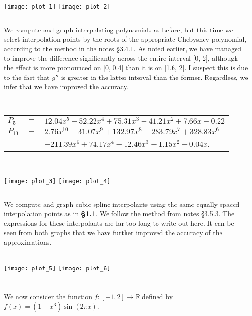 \documentclass[11pt, oneside]{article}
\begin{document}
~\\

\texttt{[image: plot\_1]}
\texttt{[image: plot\_2]}

\subsection{}

We compute and graph interpolating polynomials as before, but this time we select interpolation points by the roots of the appropriate Chebyshev polynomial, according to the method in the notes \S 3.4.1. As noted earlier, we have managed to improve the difference significantly across the entire interval [0, 2], although the effect is more pronounced on [0, 0.4] than it is on [1.6, 2]. I suspect this is due to the fact that $g''$ is greater in the latter interval than the former. Regardless, we infer that we have improved the accuracy. 

~\\


\begin{tabular}{l c l}
$P_5$ & $=$ & $12.04x^5 -52.22x^4 + 75.31x^3 -41.21x^2 + 7.66x -0.22$ \\
$P_{10}$ & $=$ &
$2.76x^{10} -31.07x^9 + 132.97x^8 -283.79x^7 + 328.83x^6 
$ \\
& & $-211.39x^5 + 74.17x^4 -12.46x^3 + 1.15x^2 -0.04x$.
\end{tabular}
\\
\flushleft

\texttt{[image: plot\_3]}
\texttt{[image: plot\_4]}

\subsection{}

We compute and graph cubic spline interpolants using the same equally spaced interpolation points as in  \textbf{\S1.1}. We follow the method from notes \S3.5.3. The expressions for these interpolants are far too long to write out here. It can be seen from both graphs that we have further improved the accuracy of the approximations. 
 
 ~\\

\texttt{[image: plot\_5]}
\texttt{[image: plot\_6]}


\section{}

We now consider the function $f: [-1, 2] \rightarrow \mathbb{R}$ defined by
$f(x) = (1 - x^3)\sin(2 \pi x)$.

\subsection{}

\subsection{}

\subsection{}
\end{document}
